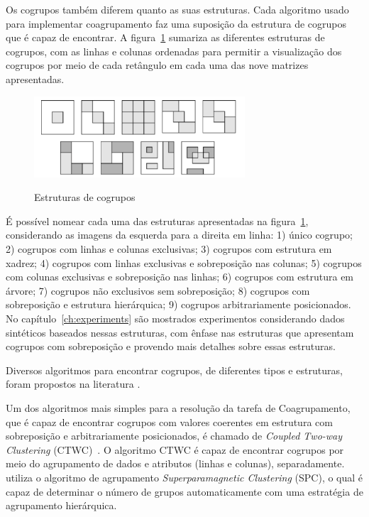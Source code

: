 \documentclass[
    12pt,                %
    oneside,            %
    a4paper,            %
    english,            %
    brazil                %
    ]{abntex2ppgsi}
\begin{document}
Os cogrupos também diferem quanto as suas estruturas.
Cada algoritmo usado para implementar coagrupamento faz uma suposição da estrutura de cogrupos que é capaz de encontrar.
A figura~\ref{fig:bicstruct} sumariza as diferentes estruturas de cogrupos, com as linhas e colunas ordenadas para permitir a visualização dos cogrupos por meio de cada retângulo em cada uma das nove matrizes apresentadas.

\begin{figure}[H]
\centering
    \caption{Estruturas de cogrupos}
    \includegraphics[width=0.7\textwidth]{img/synteticBiclusters.png}
    \label{fig:bicstruct}
\end{figure}

É possível nomear cada uma das estruturas apresentadas na figura~\ref{fig:bicstruct}, considerando as imagens da esquerda para a direita em linha: 1) único cogrupo; 2) cogrupos com linhas e colunas exclusivas; 3) cogrupos com estrutura em xadrez; 4) cogrupos com linhas exclusivas e sobreposição nas colunas; 5) cogrupos com colunas exclusivas e sobreposição nas linhas; 6) cogrupos com estrutura em árvore; 7) cogrupos não exclusivos sem sobreposição; 8) cogrupos com sobreposição e estrutura hierárquica; 9) cogrupos arbitrariamente posicionados.
No capítulo~\ref{ch:experiments} são mostrados experimentos considerando dados sintéticos baseados nessas estruturas, com ênfase nas estruturas que apresentam cogrupos com sobreposição e provendo mais detalhes sobre essas estruturas.

Diversos algoritmos para encontrar cogrupos, de diferentes tipos e estruturas, foram propostos na literatura \cite{Tanay2005,Madeira2004}.

Um dos algoritmos mais simples para a resolução da tarefa de Coagrupamento, que é capaz de encontrar cogrupos com valores coerentes em estrutura com sobreposição e arbitrariamente posicionados, é chamado de \textit{Coupled Two-way Clustering} (CTWC)~\cite{Getz2000}.
O algoritmo CTWC é capaz de encontrar cogrupos por meio do agrupamento de dados e atributos (linhas e colunas), separadamente.
 utiliza o algoritmo de agrupamento \textit{Superparamagnetic Clustering} (SPC), o qual é capaz de determinar o número de grupos automaticamente com uma estratégia de agrupamento hierárquica.
\end{document}
